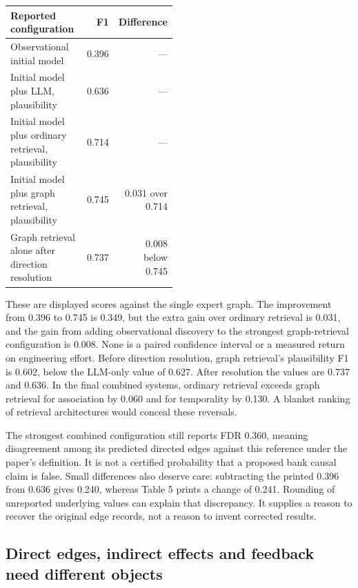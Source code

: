 \begin{center}
\begin{tabular}{p{0.48\linewidth}rr}
\hline
Reported configuration & F1 & Difference \\
\hline
Observational initial model & 0.396 & --- \\
Initial model plus LLM, plausibility & 0.636 & --- \\
Initial model plus ordinary retrieval, plausibility & 0.714 & --- \\
Initial model plus graph retrieval, plausibility & 0.745 & 0.031 over 0.714 \\
Graph retrieval alone after direction resolution & 0.737 & 0.008 below 0.745 \\
\hline
\end{tabular}
\end{center}

These are displayed scores against the single expert graph. The improvement
from 0.396 to 0.745 is 0.349, but the extra gain over ordinary retrieval is 0.031,
and the gain from adding observational discovery to the strongest graph-retrieval
configuration is 0.008. None is a paired confidence interval or a measured return
on engineering effort. Before direction resolution, graph retrieval's plausibility
F1 is 0.602, below the LLM-only value of 0.627. After resolution the values are
0.737 and 0.636. In the final combined systems, ordinary retrieval exceeds graph
retrieval for association by 0.060 and for temporality by 0.130. A blanket ranking
of retrieval architectures would conceal these reversals. \cite{exec22_domain_lin,exec22_domain_reference}

The strongest combined configuration still reports FDR 0.360, meaning disagreement
among its predicted directed edges against this reference under the paper's
definition. It is not a certified probability that a proposed bank causal claim
is false. Small differences also deserve care: subtracting the printed 0.396
from 0.636 gives 0.240, whereas Table 5 prints a change of 0.241. Rounding of
unreported underlying values can explain that discrepancy. It supplies a reason
to recover the original edge records, not a reason to invent corrected results.

\subsection{Direct edges, indirect effects and feedback need different objects}
\label{exec22:domain-semantics}

